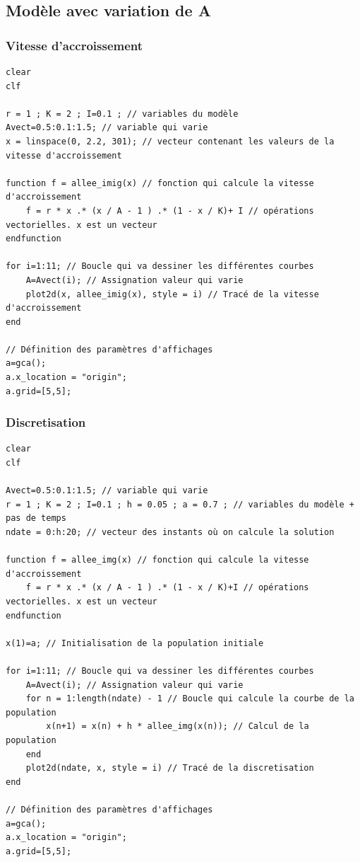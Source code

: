 \documentclass{article}
\begin{document}
\subsection{Modèle avec variation de A}

\subsubsection{Vitesse d'accroissement}

\begin{verbatim}
clear
clf

r = 1 ; K = 2 ; I=0.1 ; // variables du modèle
Avect=0.5:0.1:1.5; // variable qui varie
x = linspace(0, 2.2, 301); // vecteur contenant les valeurs de la vitesse d'accroissement

function f = allee_imig(x) // fonction qui calcule la vitesse d'accroissement
    f = r * x .* (x / A - 1 ) .* (1 - x / K)+ I // opérations vectorielles. x est un vecteur
endfunction

for i=1:11; // Boucle qui va dessiner les différentes courbes
    A=Avect(i); // Assignation valeur qui varie
    plot2d(x, allee_imig(x), style = i) // Tracé de la vitesse d'accroissement
end

// Définition des paramètres d'affichages
a=gca();
a.x_location = "origin";
a.grid=[5,5];
\end{verbatim}

\subsubsection{Discretisation}

\begin{verbatim}
clear
clf

Avect=0.5:0.1:1.5; // variable qui varie
r = 1 ; K = 2 ; I=0.1 ; h = 0.05 ; a = 0.7 ; // variables du modèle + pas de temps
ndate = 0:h:20; // vecteur des instants où on calcule la solution

function f = allee_img(x) // fonction qui calcule la vitesse d'accroissement
    f = r * x .* (x / A - 1 ) .* (1 - x / K)+I // opérations vectorielles. x est un vecteur
endfunction

x(1)=a; // Initialisation de la population initiale

for i=1:11; // Boucle qui va dessiner les différentes courbes
    A=Avect(i); // Assignation valeur qui varie
    for n = 1:length(ndate) - 1 // Boucle qui calcule la courbe de la population
        x(n+1) = x(n) + h * allee_img(x(n)); // Calcul de la population
    end 
    plot2d(ndate, x, style = i) // Tracé de la discretisation
end

// Définition des paramètres d'affichages
a=gca();
a.x_location = "origin";
a.grid=[5,5];
\end{verbatim}
\end{document}
